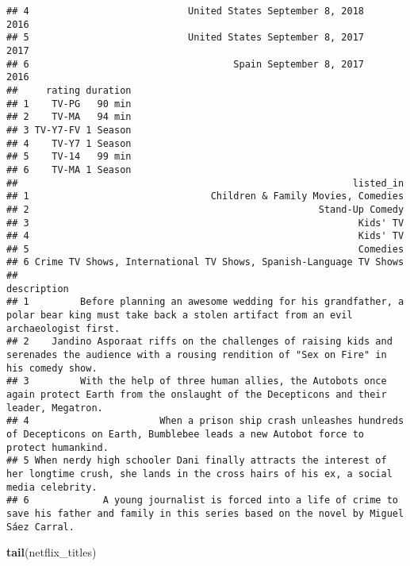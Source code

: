 \documentclass[
]{article}
\newenvironment{Shaded}{\begin{snugshade}}{\end{snugshade}}
\newcommand{\KeywordTok}[1]{\textcolor[rgb]{0.13,0.29,0.53}{\textbf{#1}}}
\newcommand{\NormalTok}[1]{#1}
\begin{document}
\begin{verbatim}
## 4                            United States September 8, 2018         2016
## 5                            United States September 8, 2017         2017
## 6                                    Spain September 8, 2017         2016
##     rating duration
## 1    TV-PG   90 min
## 2    TV-MA   94 min
## 3 TV-Y7-FV 1 Season
## 4    TV-Y7 1 Season
## 5    TV-14   99 min
## 6    TV-MA 1 Season
##                                                           listed_in
## 1                                Children & Family Movies, Comedies
## 2                                                   Stand-Up Comedy
## 3                                                          Kids' TV
## 4                                                          Kids' TV
## 5                                                          Comedies
## 6 Crime TV Shows, International TV Shows, Spanish-Language TV Shows
##                                                                                                                                            description
## 1         Before planning an awesome wedding for his grandfather, a polar bear king must take back a stolen artifact from an evil archaeologist first.
## 2    Jandino Asporaat riffs on the challenges of raising kids and serenades the audience with a rousing rendition of "Sex on Fire" in his comedy show.
## 3         With the help of three human allies, the Autobots once again protect Earth from the onslaught of the Decepticons and their leader, Megatron.
## 4                       When a prison ship crash unleashes hundreds of Decepticons on Earth, Bumblebee leads a new Autobot force to protect humankind.
## 5 When nerdy high schooler Dani finally attracts the interest of her longtime crush, she lands in the cross hairs of his ex, a social media celebrity.
## 6             A young journalist is forced into a life of crime to save his father and family in this series based on the novel by Miguel Sáez Carral.
\end{verbatim}

\begin{Shaded}
\begin{Highlighting}[]
\KeywordTok{tail}\NormalTok{(netflix_titles)}
\end{Highlighting}
\end{Shaded}
\end{document}
